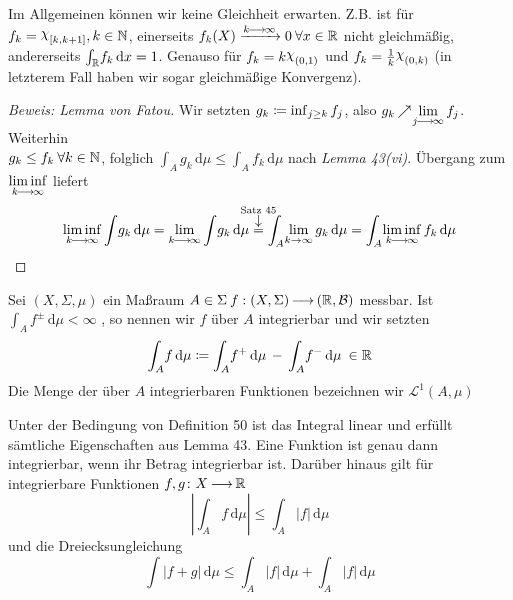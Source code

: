 \documentclass[skript.tex]{subfiles}
\begin{document}
		\begin{bem}
			Im Allgemeinen können wir keine Gleichheit erwarten. Z.B. ist für $f_k=\rchi_{[k,k+1]}, \\ k\in\N$, einerseits $f_k(X) \xrightarrow{k\kern -1pt \longrightarrow \kern -1pt\infty}0 \: \forall x\in\mathbb{R}$ nicht gleichmäßig, andererseits $\int_{\mathbb{R}} \! f_k \, \mathrm{d}x=1$. Genauso für $f_k=k\rchi_{(0,1)}$ und $f_k=\frac{1}{k}\rchi_{(0,k)}$ (in letzterem Fall haben wir sogar gleichmäßige Konvergenz).
		\end{bem}
		\begin{proof}[Beweis: Lemma von Fatou]
			Wir setzten $g_k\coloneqq \inf_{j\geq k} f_j$, also $g_k\kern -1pt \nearrow \kern -2pt \lim\limits_{j\kern -1pt \longrightarrow \kern -1pt\infty} f_j$. Weiterhin \\ $g_k\leq f_k \: \forall k\in\mathbb{N}$, folglich $\int_A \! g_k \, \mathrm{d}\mu\leq\int_A \! f_k \, \mathrm{d}\mu$ nach \textit{Lemma 43(vi)}. Übergang zum $\liminf\limits_{k\kern -1pt \longrightarrow \kern -1pt\infty}$ liefert
			\begin{equation*}
				\liminf_{k\lra\infty}\int \! g_k \, \mathrm{d}\mu= \lim\limits_{k\lra\infty} \int \! g_k \, \mathrm{d}\mu \darrow{\text{Satz 45}}{=} \int_A \! \lim_{k\to\infty} g_k \, \mathrm{d}\mu = \int_A \! \liminf\limits_{k\lra\infty} f_k \, \mathrm{d}\mu
			\end{equation*}
		\end{proof}

		\begin{defin}
			Sei $(X,\Sigma,\mu)$ ein Maßraum $A\in\Sigma \: f:(X,\Sigma) \kern -1pt \longrightarrow \kern -1pt (\mathbb{R},\mathcal{B})$ messbar. Ist $ \int_A \! f^\pm \, \mathrm{d}\mu<\infty$ , so nennen wir $f$ über $A$ integrierbar und wir setzten
			\begin{equation*}
				\int_A \! f \, \mathrm{d}\mu\coloneqq \int_A \! f^+ \, \mathrm{d}\mu \, - \, \int_A \! f^- \, \mathrm{d}\mu \: \in\mathbb{R}
			\end{equation*}
			Die Menge der über $A$ integrierbaren Funktionen bezeichnen wir $\mathscr{L}^1(A,\mu)$
		\end{defin}
		\begin{lem}
			Unter der Bedingung von \textup{Definition 50} ist das Integral linear und erfüllt sämtliche Eigenschaften aus \textup{Lemma 43}. Eine Funktion ist genau dann integrierbar, wenn ihr Betrag integrierbar ist. Darüber hinaus gilt für integrierbare Funktionen $f,g\colon X\kern -1pt \longrightarrow \kern -1pt\mathbb{R}$
			\begin{equation*}
				\left\vert \int_A \! f \, \mathrm{d}\mu\right\vert \leq \int_A \! |f| \, \mathrm{d}\mu
			\end{equation*}
			und die Dreiecksungleichung
			\begin{equation*}
				\int \! |f+g| \, \mathrm{d}\mu \leq \int_A \! |f| \, \mathrm{d}\mu + \int_A \! |f| \, \mathrm{d}\mu
			\end{equation*}
			\end{lem}
\end{document}
